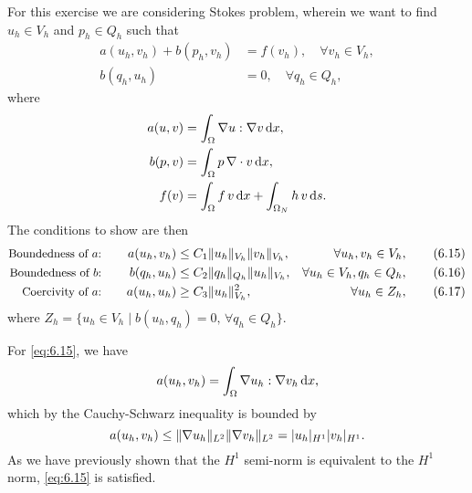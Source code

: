 \begin{solution}{6.1}
    For this exercise we are considering Stokes problem, wherein we want to find $u_h \in V_h$ and $p_h \in Q_h$ such that
    \begin{equation}
        \begin{split}
            a(u_h, v_h) + b(p_h, v_h) &= f(v_h), \quad \forall v_h \in V_h, \\
            b(q_h, u_h) &= 0, \quad \forall q_h \in Q_h,
        \end{split}
    \end{equation}
    where
    \begin{equation}
        \begin{split}
            a(u, v) &= \int_{\Omega} \nabla u : \nabla v \mathop{}\!\mathrm{d} x, \\
            b(p, v) &= \int_{\Omega} p \, \nabla \cdot v \mathop{}\!\mathrm{d} x, \\
            f(v) &= \int_{\Omega} f \, v \mathop{}\!\mathrm{d} x + \int_{\Omega_N} h \, v \mathop{}\!\mathrm{d} s.
        \end{split}
    \end{equation}
    The conditions to show are then
    \begin{align}
        \text{\small Boundedness of $a$:}
        && \quad a(u_h, v_h) &\leq C_1 \lVert u_h\rVert_{V_h} \lVert v_h\rVert_{V_h},
        & \forall u_h, v_h \in V_h,
        \tag{6.15} \label{eq:6.15}
        \\
        \text{\small Boundedness of $b$:}
        && \quad b(q_h, u_h) &\leq C_2 \lVert q_h\rVert_{Q_h} \lVert u_h\rVert_{V_h},
        & \forall u_h \in V_h, q_h \in Q_h,
        \tag{6.16} \label{eq:6.16}
        \\
        \text{\small Coercivity of $a$:}
        && \quad a(u_h, u_h) &\geq C_3 \lVert u_h\rVert_{V_h}^2,
        & \forall u_h \in Z_h,
        \tag{6.17} \label{eq:6.17}
    \end{align}
    where $Z_h = \{ u_h \in V_h \mid b(u_h, q_h) = 0, \, \forall q_h \in Q_h \}$.

    For \cref{eq:6.15}, we have
    \begin{equation}
        a(u_h, v_h) = \int_{\Omega} \nabla u_h : \nabla v_h \mathop{}\!\mathrm{d} x,
    \end{equation}
    which by the Cauchy-Schwarz inequality is bounded by
    \begin{equation}
        a(u_h, v_h) \leq \lVert\nabla u_h\rVert_{L^2} \lVert\nabla v_h\rVert_{L^2} = \lvert u_h\rvert_{H^1} \lvert v_h\rvert_{H^1}.
    \end{equation}
    As we have previously shown that the $H^1$ semi-norm is equivalent to the $H^1$ norm, \cref{eq:6.15} is satisfied.


\end{solution}
